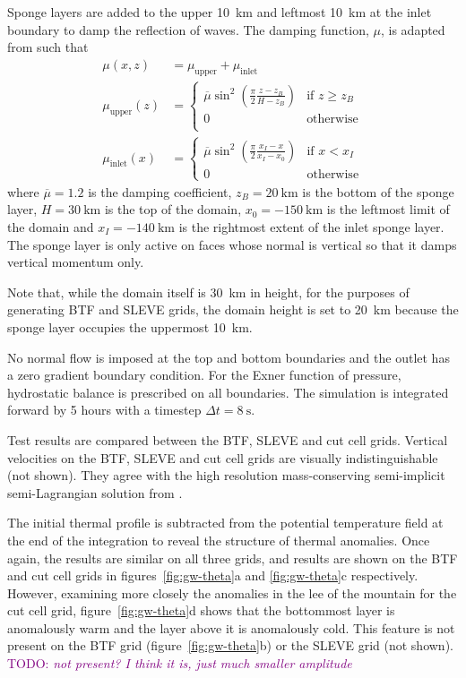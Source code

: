 \documentclass[draft]{ametsoc}
\newcommand{\TODO}[1]{\textcolor{purple}{TODO: \emph{#1}}}
\begin{document}
Sponge layers are added to the upper \SI{10}{\kilo\meter} and leftmost \SI{10}{\kilo\meter} at the inlet boundary to damp the reflection of waves.
The damping function, \(\mu\), is adapted from \citet{melvin2010} such that
\begin{align}
	\mu(x, z) &= \mu_\mathrm{upper} + \mu_\mathrm{inlet} \\
	\mu_\mathrm{upper}(z) &= \begin{cases}
		\overline{\mu} \sin^2 \left( \frac{\pi}{2} \frac{z - z_B}{H - z_B} \right) & \text{if } z \geq z_B \\
		0 & \text{otherwise} \\
	\end{cases} \\
	\mu_\mathrm{inlet}(x) &= \begin{cases}
		\overline{\mu} \sin^2 \left( \frac{\pi}{2} \frac{x_I - x}{x_I - x_0} \right) & \text{if } x < x_I \\
		0 & \text{otherwise}
	\end{cases}
\end{align}
where $\overline{\mu} = 1.2$ is the damping coefficient, $z_B = \SI{20}{\kilo\meter}$ is the bottom of the sponge layer, $H = \SI{30}{\kilo\meter}$ is the top of the domain, $x_0 = \SI{-150}{\kilo\meter}$ is the leftmost limit of the domain and $x_I = \SI{-140}{\kilo\meter}$ is the rightmost extent of the inlet sponge layer.  The sponge layer is only active on faces whose normal is vertical so that it damps vertical momentum only.

Note that, while the domain itself is \SI{30}{\kilo\meter} in height, for the purposes of generating BTF and SLEVE grids, the domain height is set to \SI{20}{\kilo\meter} because the sponge layer occupies the uppermost \SI{10}{\kilo\meter}.

No normal flow is imposed at the top and bottom boundaries and the outlet has a zero gradient boundary condition.  For the Exner function of pressure, hydrostatic balance is prescribed on all boundaries.  The simulation is integrated forward by 5 hours with a timestep $\Delta t = \SI{8}{\second}$.

Test results are compared between the BTF, SLEVE and cut cell grids.  Vertical velocities on the BTF, SLEVE and cut cell grids are visually indistinguishable (not shown).  They agree with the high resolution mass-conserving semi-implicit semi-Lagrangian solution from \citet{melvin2010}.

The initial thermal profile is subtracted from the potential temperature field at the end of the integration to reveal the structure of thermal anomalies.  Once again, the results are similar on all three grids, and results are shown on the BTF and cut cell grids in figures~\ref{fig:gw-theta}a and \ref{fig:gw-theta}c respectively.  However, examining more closely the anomalies in the lee of the mountain for the cut cell grid, figure~\ref{fig:gw-theta}d shows that the bottommost layer is anomalously warm and the layer above it is anomalously cold.  This feature is not present on the BTF grid (figure~\ref{fig:gw-theta}b) or the SLEVE grid (not shown).  \TODO{not present?  I think it is, just much smaller amplitude}
\end{document}
